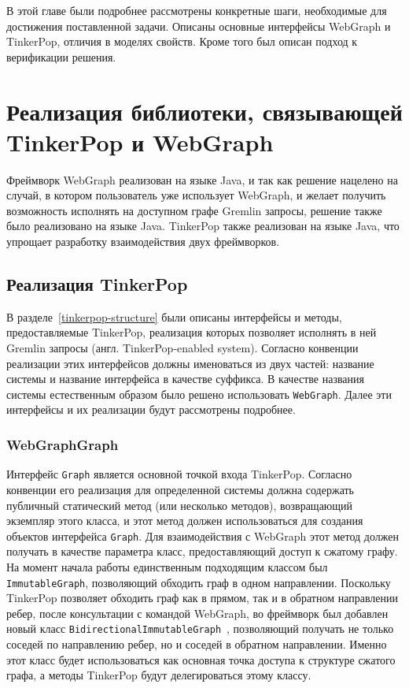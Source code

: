 \documentclass[times,specification,annotation]{itmo-student-thesis}
\begin{document}
\chapterconclusion
В этой главе были подробнее рассмотрены конкретные шаги, необходимые для достижения поставленной задачи. Описаны основные интерфейсы WebGraph и TinkerPop, отличия в моделях свойств. Кроме того был описан подход к верификации решения.

\chapter{Реализация библиотеки, связывающей TinkerPop и WebGraph}

Фреймворк WebGraph реализован на языке Java, и так как решение нацелено на случай, в котором пользователь уже использует WebGraph, и желает получить возможность исполнять на доступном графе Gremlin запросы, решение также было реализовано на языке Java. TinkerPop также реализован на языке Java, что упрощает разработку взаимодействия двух фреймворков.

\section{Реализация TinkerPop}

В разделе~\ref{tinkerpop-structure} были описаны интерфейсы и методы, предоставляемые TinkerPop, реализация которых позволяет исполнять в ней Gremlin запросы (англ. TinkerPop-enabled system). Согласно конвенции реализации этих интерфейсов должны именоваться из двух частей: название системы и название интерфейса в качестве суффикса. В качестве названия системы естественным образом было решено использовать \texttt{WebGraph}. Далее эти интерфейсы и их реализации будут рассмотрены подробнее. 

\subsection{WebGraphGraph}

Интерфейс \texttt{Graph} является основной точкой входа TinkerPop. Согласно конвенции его реализация для определенной системы должна содержать публичный статический метод (или несколько методов), возвращающий экземпляр этого класса, и этот метод должен использоваться для создания объектов интерфейса \texttt{Graph}.
Для взаимодействия с WebGraph этот метод должен получать в качестве параметра класс, предоставляющий доступ к сжатому графу. На момент начала работы единственным подходящим классом был \texttt{ImmutableGraph}, позволяющий обходить граф в одном направлении.
Поскольку TinkerPop позволяет обходить граф как в прямом, так и в обратном направлении ребер, после консультации с командой WebGraph, во фреймворк был добавлен новый класс \texttt{BidirectionalImmutableGraph}~\cite{vigna-bidir}, позволяющий получать не только соседей по направлению ребер, но и соседей в обратном направлении. Именно этот класс будет использоваться как основная точка доступа к структуре сжатого графа, а методы TinkerPop будут делегироваться этому классу.
\end{document}
